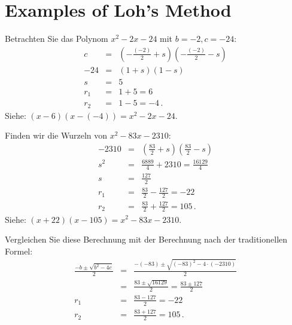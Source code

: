 \section{Examples of Loh's Method}\label{s.examples}

\begin{example}
Betrachten Sie das Polynom $x^2-2x-24$ mit $b=-2,c=-24$:
\begin{eqnarray*}
c&=&\left(-\frac{(-2)}{2} +s\right)\left(-\frac{(-2)}{2} -s\right)\\
-24&=&(1 +s)(1 -s)\\
s&=&5\\
r_1&=&1+5=6\\
r_2&=&1-5=-4\,.
\end{eqnarray*}
Siehe: $(x-6)(x-(-4))= x^2-2x-24$.
\end{example}

\begin{example}
Finden wir die Wurzeln von $x^2-83x-2310$:
\begin{eqnarray*}
-2310&=&\left(\frac{83}{2}+s\right)\left(\frac{83}{2} -s\right)\\
s^2&=&\frac{6889}{4}+2310=\frac{16129}{4}\\
s&=&\frac{127}{2}\\
r_1&=&\frac{83}{2}-\frac{127}{2}=-22\\
r_2&=&\frac{83}{2}+\frac{127}{2}=105\,.
\end{eqnarray*}
Siehe: $(x+22)(x-105)= x^2-83x-2310$.

Vergleichen Sie diese Berechnung mit der Berechnung nach der traditionellen Formel:
\begin{eqnarray*}
\frac{-b\pm\sqrt{b^2-4c}}{2}&=&\frac{-(-83)\pm\sqrt{(-83)^2-4\cdot (-2310)}}{2}\\
&=& \frac{83\pm\sqrt{16129}}{2} = \frac{83\pm 127}{2}\\
r_1&=&\frac{83-127}{2}=-22\\
r_2&=&\frac{83+127}{2}=105\,.
\end{eqnarray*}
\end{example}

